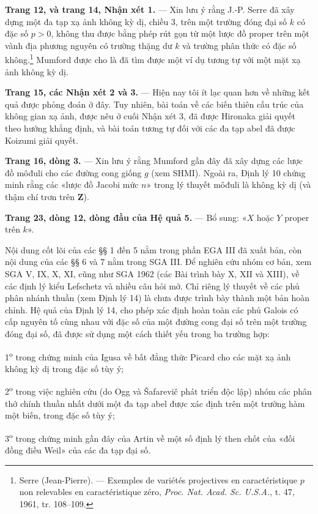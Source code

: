 \documentclass[11pt,twoside,openany]{book}
\numberwithin{equation}{section}
\newcommand{\src}[1]{%
  \phantomsection\hypertarget{src:\fgasourceid:#1}{}%
  \marginpar{\raggedleft\footnotesize\sffamily #1}%
}
\newcommand{\fgasourceid}{unset}
\begin{document}
\src{299}
\noindent\textbf{Trang 12, và trang 14, Nhận xét 1.} --- Xin lưu ý rằng J.-P.
Serre đã xây dựng một đa tạp xạ ảnh không kỳ dị, chiều 3, trên một trường đóng
đại số $k$ có đặc số $p>0$, không thu được bằng phép rút gọn từ một lược đồ
proper trên một vành địa phương nguyên có trường thặng dư $k$ và trường phân
thức có đặc số không.\footnote{Serre (Jean-Pierre). --- Exemples de variétés
projectives en caractéristique $p$ non relevables en caractéristique zéro,
\emph{Proc. Nat. Acad. Sc. U.S.A.}, t. 47, 1961, tr. 108--109.} Mumford được
cho là đã tìm được một ví dụ tương tự với một mặt xạ ảnh không kỳ dị.

\noindent\textbf{Trang 15, các Nhận xét 2 và 3.} --- Hiện nay tôi ít lạc quan
hơn về những kết quả được phỏng đoán ở đây. Tuy nhiên, bài toán về các biến
thiên cấu trúc của không gian xạ ảnh, được nêu ở cuối Nhận xét 3, đã được
Hironaka giải quyết theo hướng khẳng định, và bài toán tương tự đối với các đa
tạp abel đã được Koizumi giải quyết.

\noindent\textbf{Trang 16, dòng 3.} --- Xin lưu ý rằng Mumford gần đây đã xây
dựng các lược đồ môđuli cho các đường cong giống $g$ (xem SHMI). Ngoài ra,
Định lý 10 chứng minh rằng các «lược đồ Jacobi mức $n$» trong lý thuyết môđuli
là không kỳ dị (và thậm chí trơn trên $\mathbf Z$).

\noindent\textbf{Trang 23, dòng 12, dòng đầu của Hệ quả 5.} --- Bổ sung:
«$X$ hoặc $Y$ proper trên $k$».

Nội dung cốt lõi của các §§ 1 đến 5 nằm trong phần EGA III đã xuất bản, còn
nội dung của các §§ 6 và 7 nằm trong SGA III. Để nghiên cứu nhóm cơ bản, xem
SGA V, IX, X, XI, cũng như SGA 1962 (các Bài trình bày X, XII và XIII), về các
định lý kiểu Lefschetz và nhiều câu hỏi mở. Chỉ riêng lý thuyết về các phủ phân
nhánh thuần (xem Định lý 14) là chưa được trình bày thành một bản hoàn chỉnh.
Hệ quả của Định lý 14, cho phép xác định hoàn toàn các phủ Galois có cấp nguyên
tố cùng nhau với đặc số của một đường cong đại số trên một trường đóng đại số,
đã được sử dụng một cách thiết yếu trong ba trường hợp:

1\textsuperscript{o} trong chứng minh của Igusa về bất đẳng thức Picard cho
các mặt xạ ảnh không kỳ dị trong đặc số tùy ý;

2\textsuperscript{o} trong việc nghiên cứu (do Ogg và Šafarevič phát triển độc
lập) nhóm các phân thớ chính thuần nhất dưới một đa tạp abel được xác định trên
một trường hàm một biến, trong đặc số tùy ý;

3\textsuperscript{o} trong chứng minh gần đây của Artin về một số định lý then
chốt của «đối đồng điều Weil» của các đa tạp đại số.
\end{document}
